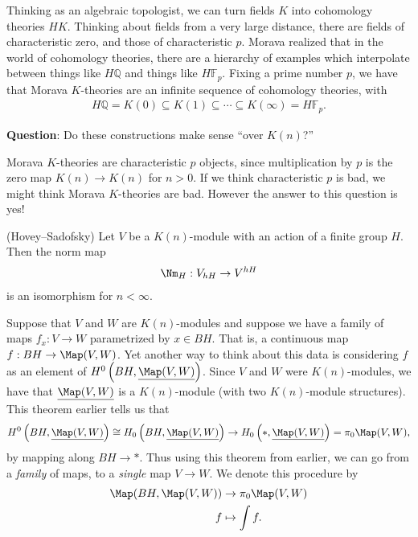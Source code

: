 Thinking as an algebraic topologist, we can turn fields $K$ into cohomology theories $HK$. Thinking about fields from a very large distance, there are fields of characteristic zero, and those of characteristic $p$. Morava realized that in the world of cohomology theories, there are a hierarchy of examples which interpolate between things like $H \mathbb{Q}$ and things like $H \mathbb{F}_p$. Fixing a prime number $p$, we have that Morava $K$-theories are an infinite sequence of cohomology theories, with
\begin{align*}
    H \mathbb{Q} = K(0) \subseteq K(1) \subseteq \cdots \subseteq K(\infty) = H \mathbb{F}_p.
\end{align*}

\textbf{Question}: Do these constructions make sense ``over $K(n)$?''

Morava $K$-theories are characteristic $p$ objects, since multiplication by $p$ is the zero map $K(n) \to K(n)$ for $n>0$. If we think characteristic $p$ is bad, we might think Morava $K$-theories are bad. However the answer to this question is yes!

\begin{theorem} (Hovey--Sadofsky) Let $V$ be a $K(n)$-module with an action of a finite group $H$. Then the norm map
\begin{align*}
    \Nm_H : V_{hH} \to V^{hH}
\end{align*}
is an isomorphism for $n< \infty$.
\end{theorem}

Suppose that $V$ and $W$ are $K(n)$-modules and suppose we have a family of maps $f_x : V \to W$ parametrized by $x\in BH$. That is, a continuous map $f: BH \to \Map(V,W)$. Yet another way to think about this data is considering $f$ as an element of $H^0 \left( BH, \underline{\Map(V,W)} \right)$. Since $V$ and $W$ were $K(n)$-modules, we have that $\underline{\Map(V,W)}$ is a $K(n)$-module (with two $K(n)$-module structures). This theorem earlier tells us that
\begin{align*}
    H^0 \left( BH, \underline{\Map(V,W)} \right) \cong H_0 \left( BH, \underline{\Map(V,W)} \right) \to H_0 \left( \ast, \underline{\Map(V,W)} \right) = \pi_0 \Map(V,W),
\end{align*}
by mapping along $BH \to \ast$. Thus using this theorem from earlier, we can go from a \textit{family} of maps, to a \textit{single} map $V \to W$. We denote this procedure by
\begin{align*}
    \Map(BH, \Map(V,W)) &\to \pi_0 \Map(V,W) \\
    f &\mapsto \int f.
\end{align*}

